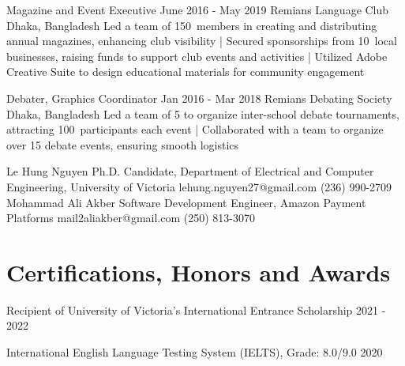 \documentclass[a4paper,10pt]{article}
\begin{document}
\relevantexperience
{Magazine and Event Executive}
{June 2016 - May 2019}
{Remians Language Club}
{Dhaka, Bangladesh}
{Led a team of 150\plus\ members in creating and distributing annual magazines, enhancing club visibility
| Secured sponsorships from 10\plus\ local businesses, raising funds to support club events and activities 
| Utilized Adobe Creative Suite to design educational materials for community engagement
}

\relevantexperience
{Debater, Graphics Coordinator}
{Jan 2016 - Mar 2018}
{Remians Debating Society}
{Dhaka, Bangladesh}
{Led a team of 5 to organize inter-school debate tournaments, attracting 100\plus\ participants each event
| Collaborated with a team to organize over 15 debate events, ensuring smooth logistics 
}

\begin{references}
        {Le Hung Nguyen}
        {Ph.D. Candidate, Department of Electrical and}
        {Computer Engineering, University of Victoria}
        {lehung.nguyen27@gmail.com}
        {(236) 990-2709}
    \hfill
        {Mohammad Ali Akber}
        {Software Development Engineer,}
        {Amazon Payment Platforms}
        {mail2aliakber@gmail.com}
        {(250) 813-3070}
\end{references}

\section{Certifications, Honors and Awards}
\honorsawards
{Recipient of University of Victoria’s International Entrance Scholarship}
{2021 - 2022}

\honorsawards
{International English Language Testing System (IELTS), Grade: 8.0/9.0}
{2020}
\end{document}
